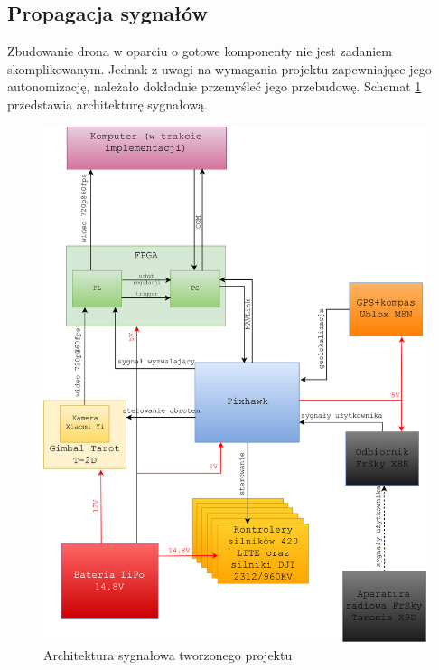 \subsection{Propagacja sygnałów} %

Zbudowanie drona w oparciu o gotowe komponenty nie jest zadaniem skomplikowanym. 
Jednak z uwagi na wymagania projektu zapewniające jego autonomizację, należało dokładnie przemyśleć jego przebudowę. %
Schemat \ref{fig:architecture} przedstawia architekturę sygnałową. %
\begin{figure}[]
	\centering
	\includegraphics[width=14cm]{5_drone_architecture.png}
	\caption{Architektura sygnałowa tworzonego projektu}
	\label{fig:architecture}
\end{figure}



